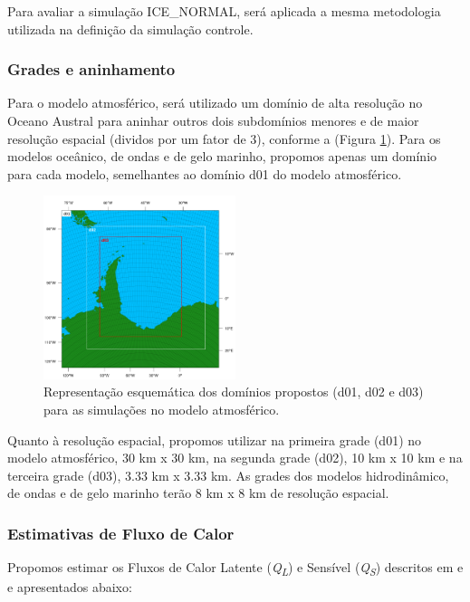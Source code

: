 \documentclass{article}
\begin{document}
Para avaliar a simulação ICE\_NORMAL, será aplicada a mesma metodologia utilizada na definição da simulação controle.
\bigskip


\subsubsection{Grades e aninhamento}
\bigskip
Para o modelo atmosférico, será utilizado um domínio de alta resolução no Oceano Austral para aninhar outros dois subdomínios
menores e de maior resolução espacial (dividos por um fator de 3), conforme a (\textcolor{bleu_cite}{Figura \ref{wrfdomain}}). 
Para os modelos oceânico, de ondas e de gelo marinho, propomos apenas um domínio para cada modelo, semelhantes ao domínio d01 
do modelo atmosférico.
\bigskip

\begin{figure}[H]
    \centering
    \includegraphics[width=0.50\textwidth]{img/domainswrf.png}
	\caption{Representação esquemática dos domínios propostos (d01, d02 e d03) para as simulações no modelo atmosférico.}
	\label{wrfdomain}
\end{figure}

Quanto à resolução espacial, propomos utilizar na primeira grade (d01) no modelo atmosférico, 30 km x 30 km, na segunda grade (d02), 
10 km x 10 km e na terceira grade (d03), 3.33 km x 3.33 km. As grades dos modelos hidrodinâmico, de ondas e de gelo marinho terão 
8 km x 8 km de resolução espacial.
\bigskip


\subsubsection{Estimativas de Fluxo de Calor}
\bigskip

Propomos estimar os Fluxos de Calor Latente (\textit{Q\textsubscript{L}}) e Sensível (\textit{Q\textsubscript{S}}) descritos em \textcite{Pezzi2009} e \textcite{Fairall1996}
e apresentados abaixo:
\end{document}
